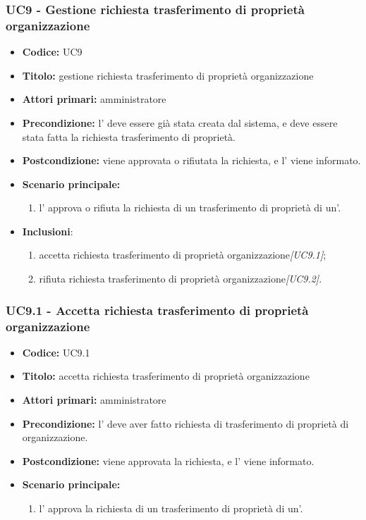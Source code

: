 \documentclass[casi-duso]{subfiles}
\begin{document}
\subsubsection{UC9 - Gestione richiesta trasferimento di proprietà organizzazione}
\label{subsub:UC9}
\begin{itemize}
  \item \textbf{Codice:} UC9
  \item \textbf{Titolo:} gestione richiesta trasferimento di proprietà organizzazione
  \item \textbf{Attori primari:} amministratore
  \item \textbf{Precondizione:} l' deve essere già stata creata dal sistema, e deve essere stata fatta la richiesta trasferimento di proprietà.
  \item \textbf{Postcondizione:} viene approvata o rifiutata la richiesta, e l' viene informato.
  \item \textbf{Scenario principale:}
  \begin{enumerate}
    \item l' approva o rifiuta la richiesta di un trasferimento di proprietà di un'.
  \end{enumerate}
  \item \textbf{Inclusioni}:
  \begin{enumerate}
    \item accetta richiesta trasferimento di proprietà organizzazione\emph{[UC9.1]};
    \item rifiuta richiesta trasferimento di proprietà organizzazione\emph{[UC9.2]}.
  \end{enumerate}
\end{itemize}

\subsubsection{UC9.1 - Accetta richiesta trasferimento di proprietà organizzazione}
\label{subsub:UC9.1}
\begin{itemize}
  \item \textbf{Codice:} UC9.1
  \item \textbf{Titolo:} accetta richiesta trasferimento di proprietà organizzazione
  \item \textbf{Attori primari:} amministratore
  \item \textbf{Precondizione:} l' deve aver fatto richiesta di trasferimento di proprietà di organizzazione.
  \item \textbf{Postcondizione:} viene approvata la richiesta, e l' viene informato.
  \item \textbf{Scenario principale:} 
  \begin{enumerate}
    \item l' approva la richiesta di un trasferimento di proprietà di un'.
  \end{enumerate}
\end{itemize}  
\end{document}
